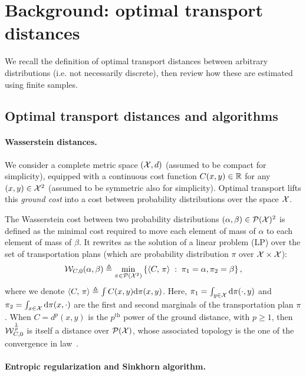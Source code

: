 \section{Background: optimal transport distances}

We recall the definition of optimal transport distances between arbitrary distributions (i.e. not necessarily discrete), then review how these are estimated using finite samples.

\subsection{Optimal transport distances and algorithms}

\paragraph{Wasserstein distances.} 

We consider a complete metric space $(\mathcal{X},d)$ (assumed to be compact for simplicity), equipped
with a continuous cost function $C(x,y) \in \mathbb{R}$ for any $(x,y) \in \mathcal{X}^2$ (assumed to be symmetric also for simplicity). 
%
Optimal transport lifts this \textit{ground cost} into a cost between probability
distributions over the space $\mathcal{X}$. 
%

The Wasserstein cost between two probability distributions $(\alpha, \beta) \in \mathcal{P}(\mathcal{X})^2$ is defined as the minimal cost required to move each element of mass of $\alpha$ to each element of mass of $\beta$. It rewrites as the solution of a
linear problem (LP) over the set of transportation plans (which are probability distribution $\pi$ over $\mathcal{X} \times \mathcal{X}$):
\begin{equation}\label{eq:wass}
    \mathcal{W}_{C,0}(\alpha, \beta) \triangleq 
    \min_{\pi \in \mathcal{P}(\mathcal{X}^2)}
    \left\{ 
    	\langle C,\,\pi\rangle
	 \;:\;  \pi_1=\alpha, \pi_2=\beta \right\},
\end{equation}
where we denote $\langle C,\,\pi\rangle \triangleq \int C(x,y) \textrm{d}\pi(x,y)$. Here,  
$\pi_1 = \int_{y\in \mathcal{X}} \textrm{d} \pi(\cdot, y)$ and $\pi_2 = \int_{x\in \mathcal{X}} \textrm{d}
\pi(x, \cdot)$ are the first and second marginals of the transportation plan $\pi$. 
%
When $C=d^p(x,y)$ is the $p^{\text{th}}$ power of the ground distance, with $p
\geq 1$, then $\mathcal{W}_{C,0}^{\frac{1}{p}}$ is itself a distance over $\mathcal{P}(\mathcal{X})$, whose
associated topology is the one of the convergence in
law~\cite{santambrogio2015optimal}.

\paragraph{Entropic regularization and Sinkhorn algorithm.} 

